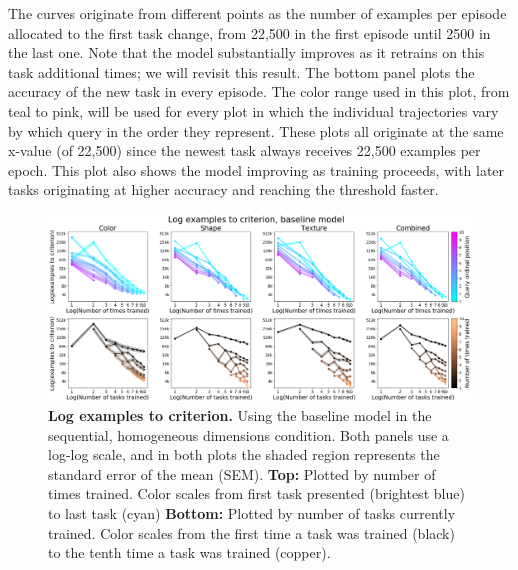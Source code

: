 The curves originate from different points as the number of examples per episode allocated to the first task change, from 22,500 in the first episode until 2500 in the last one. Note that the model substantially improves as it retrains on this task additional times; we will revisit this result. The bottom panel plots the accuracy of the new task in every episode. The color range used in this plot, from teal to pink, will be used for every plot in which the individual trajectories vary by which query in the order they represent. These plots all originate at the same x-value (of 22,500) since the newest task always receives 22,500 examples per epoch. This plot also shows the model improving as training proceeds, with later tasks originating at higher accuracy and reaching the threshold faster.

\begin{figure}[!htb]
\centering
\includegraphics[width=\linewidth]{ch-results/figures/baseline_sequential/examples_to_criterion.png}
\caption[Log examples to criterion.]{ {\bf Log examples to criterion.} Using the baseline model in the sequential, homogeneous dimensions condition. Both panels use a log-log scale, and in both plots the shaded region represents the standard error of the mean (SEM). \textbf{Top:} Plotted by number of times trained. Color scales from first task presented (brightest blue) to last task (cyan) \textbf{Bottom:} Plotted by number of tasks currently trained. Color scales from the first time a task was trained (black) to the tenth time a task was trained (copper).}
\label{fig:results-baseline-sequential-examples-to-criterion}
\end{figure}

